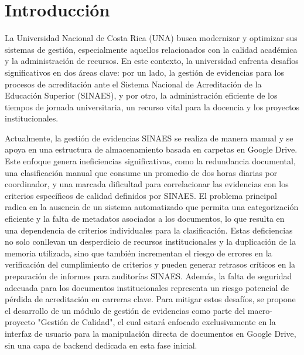 
\chapter{Introducción} 

La Universidad Nacional de Costa Rica (UNA) busca modernizar y optimizar sus sistemas de gestión, especialmente aquellos relacionados con la calidad académica y la administración de recursos. En este contexto, la universidad enfrenta desafíos significativos en dos áreas clave: por un lado, la gestión de evidencias para los procesos de acreditación ante el Sistema Nacional de Acreditación de la Educación Superior (SINAES), y por otro, la administración eficiente de los tiempos de jornada universitaria, un recurso vital para la docencia y los proyectos institucionales.

Actualmente, la gestión de evidencias SINAES se realiza de manera manual y se apoya en una estructura de almacenamiento basada en carpetas en Google Drive. Este enfoque genera ineficiencias significativas, como la redundancia documental, una clasificación manual que consume un promedio de dos horas diarias por coordinador, y una marcada dificultad para correlacionar las evidencias con los criterios específicos de calidad definidos por SINAES. El problema principal radica en la ausencia de un sistema automatizado que permita una categorización eficiente y la falta de metadatos asociados a los documentos, lo que resulta en una dependencia de criterios individuales para la clasificación. Estas deficiencias no solo conllevan un desperdicio de recursos institucionales y la duplicación de la memoria utilizada, sino que también incrementan el riesgo de errores en la verificación del cumplimiento de criterios y pueden generar retrasos críticos en la preparación de informes para auditorías SINAES. Además, la falta de seguridad adecuada para los documentos institucionales representa un riesgo potencial de pérdida de acreditación en carreras clave. Para mitigar estos desafíos, se propone el desarrollo de un módulo de gestión de evidencias como parte del macro-proyecto "Gestión de Calidad", el cual estará enfocado exclusivamente en la interfaz de usuario para la manipulación directa de documentos en Google Drive, sin una capa de backend dedicada en esta fase inicial.
